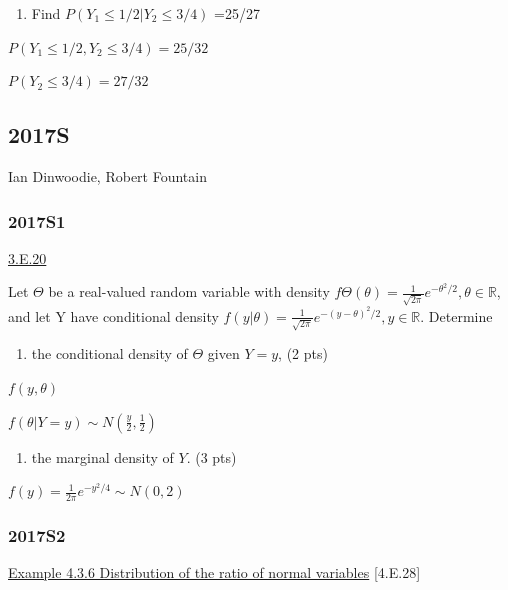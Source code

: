 \documentclass[10pt,twocolumn,portrait]{article}
\providecommand{\tightlist}{%
  \setlength{\itemsep}{0pt}\setlength{\parskip}{0pt}}
\begin{document}
\begin{enumerate}
\def\labelenumi{(\alph{enumi})}
\setcounter{enumi}{2}
\tightlist
\item
  Find \(P(Y_1\le1/2|Y_2\le3/4)\) =25/27
\end{enumerate}

\(P(Y_1\le1/2, Y_2\le3/4)=25/32\)

\(P(Y_2\le3/4)=27/32\)

\hypertarget{s-9}{%
\subsection{2017S}\label{s-9}}

Ian Dinwoodie, Robert Fountain

\hypertarget{s1-5}{%
\subsubsection{2017S1}\label{s1-5}}

\protect\hyperlink{e.20}{3.E.20}

Let \(\Theta\) be a real-valued random variable with density
\(f\Theta(\theta) = \frac1{\sqrt{2\pi}}e^{-\theta^2/2},\theta\in\mathbb R\),
and let Y have conditional density
\(f(y|\theta) = \frac1{\sqrt{2\pi}}e^{-(y-\theta)^2/2},y\in\mathbb R\).
Determine

\begin{enumerate}
\def\labelenumi{(\alph{enumi})}
\tightlist
\item
  the conditional density of \(\Theta\) given \(Y = y\), (2 pts)
\end{enumerate}

\(f(y,\theta)\)

\(f(\theta|Y=y)\sim N(\frac{y}2,\frac12)\)

\begin{enumerate}
\def\labelenumi{(\alph{enumi})}
\setcounter{enumi}{1}
\tightlist
\item
  the marginal density of \(Y\). (3 pts)
\end{enumerate}

\(f(y)=\frac1{2\pi}e^{-y^2/4}\sim N(0,2)\)

\hypertarget{s2-5}{%
\subsubsection{2017S2}\label{s2-5}}

\protect\hyperlink{Cauchy}{Example 4.3.6 Distribution of the ratio of
normal variables} {[}4.E.28{]}
\end{document}
